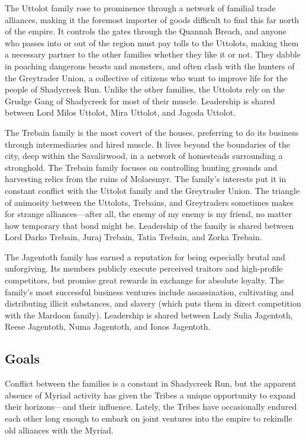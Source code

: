 \documentclass[10pt,a4paper,twoside,bg=print,twocolumn,openany,nodeprecatedcode]{dndbook}
\begin{document}
The Uttolot family rose to prominence through a network of familial trade alliances, making it the foremost importer of goods difficult to find this far north of the empire. It controls the gates through the Quannah Breach, and anyone who passes into or out of the region must pay tolls to the Uttolots, making them a necessary partner to the other families whether they like it or not. They dabble in poaching dangerous beasts and monsters, and often clash with the hunters of the Greytrader Union, a collective of citizens who want to improve life for the people of Shadycreek Run. Unlike the other families, the Uttolots rely on the Grudge Gang of Shadycreek for most of their muscle. Leadership is shared between Lord Milos Uttolot, Mira Uttolot, and Jagoda Uttolot.

The Trebain family is the most covert of the houses, preferring to do its business through intermediaries and hired muscle. It lives beyond the boundaries of the city, deep within the Savalirwood, in a network of homesteads surrounding a stronghold. The Trebain family focuses on controlling hunting grounds and harvesting relics from the ruins of Molaesmyr. The family's interests put it in constant conflict with the Uttolot family and the Greytrader Union. The triangle of animosity between the Uttolots, Trebains, and Greytraders sometimes makes for strange alliances—after all, the enemy of my enemy is my friend, no matter how temporary that bond might be. Leadership of the family is shared between Lord Darko Trebain, Juraj Trebain, Tatia Trebain, and Zorka Trebain.

The Jagentoth family has earned a reputation for being especially brutal and unforgiving. Its members publicly execute perceived traitors and high-profile competitors, but promise great rewards in exchange for absolute loyalty. The family's most successful business ventures include assassination, cultivating and distributing illicit substances, and slavery (which puts them in direct competition with the Mardoon family). Leadership is shared between Lady Sulia Jagentoth, Reese Jagentoth, Numa Jagentoth, and Ionos Jagentoth.

\subsection{Goals}
Conflict between the families is a constant in Shadycreek Run, but the apparent absence of Myriad activity has given the Tribes a unique opportunity to expand their horizons—and their influence. Lately, the Tribes have occasionally endured each other long enough to embark on joint ventures into the empire to rekindle old alliances with the Myriad.
\end{document}
